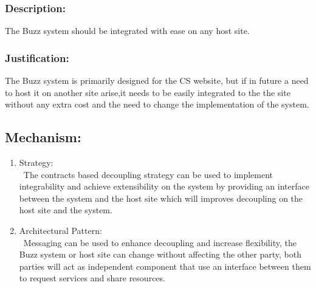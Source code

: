 
\subsubsection*{Description:}
	  The Buzz system should be integrated with ease on any host site.
	 \subsubsection*{Justification:}
	  The Buzz system is primarily designed for the CS website, but if in future a need to host it on another site arise,it needs to be easily integrated to the the site without any extra cost and the need  to change the implementation of the system.
	\subsection*{Mechanism:}
	\begin{enumerate}
		\item Strategy: \\\ The contracts based decoupling strategy can be used to implement integrability and achieve extensibility on the system by providing an interface between the system and the host site which will improves decoupling on the host site and the system.    
		\item Architectural Pattern: \\\ Messaging can be used to enhance decoupling and increase flexibility, the Buzz system or host site can change without affecting the other party, both parties will act as independent component that use an interface between them to request services and share resources.  
	\end{enumerate}
